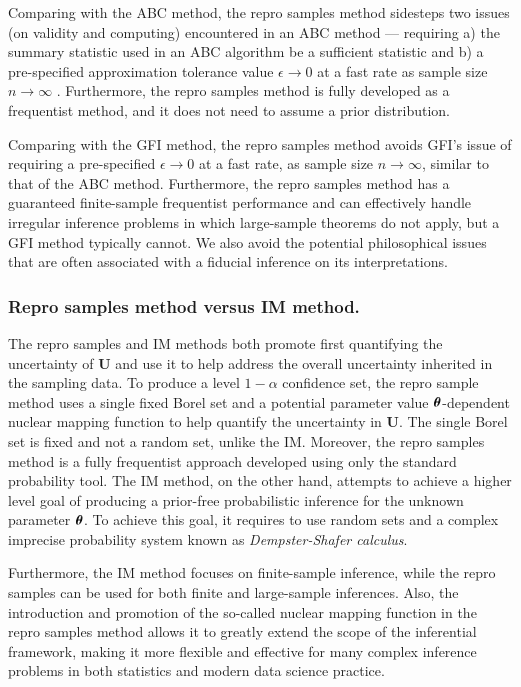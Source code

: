 \documentclass[12pt]{article}
\theoremstyle{shortspace}
\def\*#1{\bm{#1}}
\def\btheta{\mathop{\theta\kern-.45em\hbox{$\theta$}}\nolimits}
\begin{document}
Comparing with the ABC method, the repro samples method sidesteps two issues (on validity and computing) 
encountered in 
an ABC method --- requiring  a) the summary statistic used in an ABC algorithm be a sufficient statistic 
and b) a pre-specified approximation tolerance 
value $\epsilon \to 0$ at a fast rate as sample size $n \to \infty$ \citep{Li2016}. 
Furthermore, the repro samples method is fully developed as
a  frequentist 
method, and it does not need  to assume 
 a prior distribution. 
 
 Comparing with the GFI method, the repro samples method avoids GFI's issue of requiring a pre-specified $\epsilon \to 0$ at a fast rate, as sample size $n \to \infty$, 
 similar to that of the ABC method. 
Furthermore, 
the repro samples method 
has a guaranteed finite-sample frequentist performance and can effectively handle irregular inference problems in which large-sample theorems do not apply, but a GFI method typically cannot. We also avoid the potential philosophical issues that are often associated with a fiducial inference on its interpretations. 
\subsubsection{Repro samples method versus IM method.}
The repro samples and IM  methods both promote first quantifying the uncertainty of $\*U$ and use it to help address the overall uncertainty inherited in the sampling data. To produce a level $1 - \alpha$ confidence set, the repro sample method uses a single fixed Borel set and a potential parameter value $\btheta$-dependent nuclear mapping function to help quantify the uncertainty in $\*U$. The single Borel set is fixed and not a random set, unlike the IM.   Moreover, the repro samples method is a fully frequentist approach
developed using only the standard probability tool. The IM method, on the other hand, attempts to achieve a higher level goal of producing a prior-free probabilistic inference for the unknown parameter $\btheta$. To achieve this goal, it requires to use random sets and a complex imprecise probability system known as {\it Dempster-Shafer calculus}. 

Furthermore, the IM method focuses on finite-sample inference, while the repro samples can be used for both finite and large-sample inferences. Also, the introduction and promotion of the so-called nuclear mapping function in the repro samples method allows it to greatly extend the scope of the inferential framework, 
making it more flexible and effective for many complex inference problems in both statistics and modern data science practice.
\end{document}
